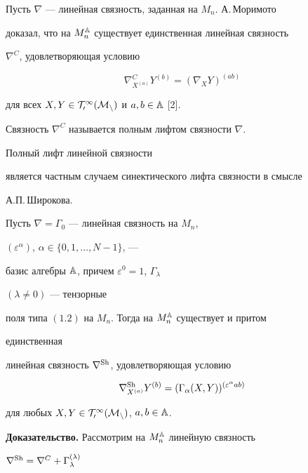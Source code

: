 


Пусть $\nabla$ --- линейная связность, заданная на $M_n$. А.\,Моримото 


доказал, что на $M^{\Bbb A}_n$ существует единственная линейная связность


$\nabla^C$, удовлетворяющая условию 


$$ 


\nabla^C_{X^{(a)}}Y^{(b)}=(\nabla_X Y)^{(a b)} 


$$ 


для всех $X,Y\in\cal T^1_0(M_n)$ и $a,b\in\Bbb A$ [2].


Связность $\nabla^C$ называется полным лифтом связности $\nabla$.


Полный лифт линейной связности  


является частным случаем синектического лифта связности в смысле 


А.П.\,Широкова. 


 


\begin{props} Пусть $\nabla=\Gamma_0$ --- линейная связность на $M_n$, 


$(\varepsilon^\alpha)$, $\alpha\in\{0,1,\dotsc,N-1\}$, --- 


базис алгебры $\Bbb A$, причем $\varepsilon^0=1$, $\Gamma_\lambda$ 


$(\lambda\ne 0)$ --- тензорные  


поля типа $(1.2)$ на $M_n$. Тогда на $M^{\Bbb A}_n$ существует и притом 


единственная 


линейная связность $\nabla^{\operatorname{Sh}}$, удовлетворяющая условию 


\begin{equation} 


\nabla^{\Sh}_{X^{(a)}}Y^{(b)}=(\Gamma_\alpha(X,Y) 


)^{(\varepsilon^\alpha ab)} 


\end{equation} 


для любых $X,Y\in\cal T^1_0(M_n)$, $a,b\in\Bbb A$. 


\end{props} 


 


{\bf Доказательство.} Рассмотрим на $M^{\Bbb A}_n$ линейную связность 


$\nabla^{\operatorname{Sh}}=\nabla^C+\Gamma^{(\lambda)}_\lambda$ 


